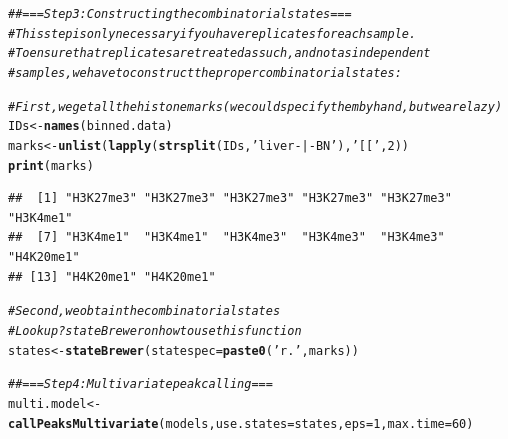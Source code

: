 \documentclass[11pt]{article}\usepackage[]{graphicx}\usepackage[]{color}
\makeatletter
\newcommand{\hlnum}[1]{\textcolor[rgb]{0.686,0.059,0.569}{#1}}%
\newcommand{\hlstr}[1]{\textcolor[rgb]{0.192,0.494,0.8}{#1}}%
\newcommand{\hlcom}[1]{\textcolor[rgb]{0.678,0.584,0.686}{\textit{#1}}}%
\newcommand{\hlstd}[1]{\textcolor[rgb]{0.345,0.345,0.345}{#1}}%
\newcommand{\hlkwb}[1]{\textcolor[rgb]{0.69,0.353,0.396}{#1}}%
\newcommand{\hlkwc}[1]{\textcolor[rgb]{0.333,0.667,0.333}{#1}}%
\newcommand{\hlkwd}[1]{\textcolor[rgb]{0.737,0.353,0.396}{\textbf{#1}}}%
\newenvironment{kframe}{%
 \def\at@end@of@kframe{}%
 \ifinner\ifhmode%
  \def\at@end@of@kframe{\end{minipage}}%
  \begin{minipage}{\columnwidth}%
 \fi\fi%
 \def\FrameCommand##1{\hskip\@totalleftmargin \hskip-\fboxsep
 \colorbox{shadecolor}{##1}\hskip-\fboxsep
     \hskip-\linewidth \hskip-\@totalleftmargin \hskip\columnwidth}%
 \MakeFramed {\advance\hsize-\width
   \@totalleftmargin\z@ \linewidth\hsize
   \@setminipage}}%
 {\par\unskip\endMakeFramed%
 \at@end@of@kframe}
\newenvironment{knitrout}{}{} %
\makeatother
\begin{document}
\begin{scriptsize}
\begin{knitrout}
\color{fgcolor}\begin{kframe}
\begin{alltt}
\hlcom{## === Step 3: Constructing the combinatorial states ===}
\hlcom{# This step is only necessary if you have replicates for each sample.}
\hlcom{# To ensure that replicates are treated as such, and not as independent}
\hlcom{# samples, we have to construct the proper combinatorial states:}

\hlcom{# First, we get all the histone marks (we could specify them by hand, but we are lazy)}
\hlstd{IDs} \hlkwb{<-} \hlkwd{names}\hlstd{(binned.data)}
\hlstd{marks} \hlkwb{<-} \hlkwd{unlist}\hlstd{(}\hlkwd{lapply}\hlstd{(}\hlkwd{strsplit}\hlstd{(IDs,} \hlstr{'liver-|-BN'}\hlstd{),} \hlstr{'[['}\hlstd{,} \hlnum{2}\hlstd{))}
\hlkwd{print}\hlstd{(marks)}
\end{alltt}
\begin{verbatim}
##  [1] "H3K27me3" "H3K27me3" "H3K27me3" "H3K27me3" "H3K27me3" "H3K4me1" 
##  [7] "H3K4me1"  "H3K4me1"  "H3K4me3"  "H3K4me3"  "H3K4me3"  "H4K20me1"
## [13] "H4K20me1" "H4K20me1"
\end{verbatim}
\begin{alltt}
\hlcom{# Second, we obtain the combinatorial states}
\hlcom{# Look up ?stateBrewer on how to use this function}
\hlstd{states} \hlkwb{<-} \hlkwd{stateBrewer}\hlstd{(}\hlkwc{statespec} \hlstd{=} \hlkwd{paste0}\hlstd{(}\hlstr{'r.'}\hlstd{, marks))}
\end{alltt}
\end{kframe}
\end{knitrout}

\begin{knitrout}
\color{fgcolor}\begin{kframe}
\begin{alltt}
\hlcom{## === Step 4: Multivariate peak calling ===}
\hlstd{multi.model} \hlkwb{<-} \hlkwd{callPeaksMultivariate}\hlstd{(models,} \hlkwc{use.states}\hlstd{=states,} \hlkwc{eps}\hlstd{=}\hlnum{1}\hlstd{,} \hlkwc{max.time}\hlstd{=}\hlnum{60}\hlstd{)}
\end{alltt}



\end{kframe}
\end{knitrout}
\end{scriptsize}
\end{document}
